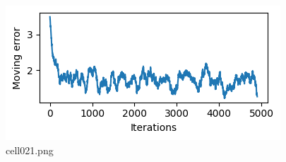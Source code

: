 \begin{figure}[ht]
	\centering
	\includegraphics[scale=0.8, max width=\linewidth]{./fig/energy-based-model/predictive-coding/cell021.png}
	\caption{cell021.png}
	\label{cell021.png}
\end{figure}